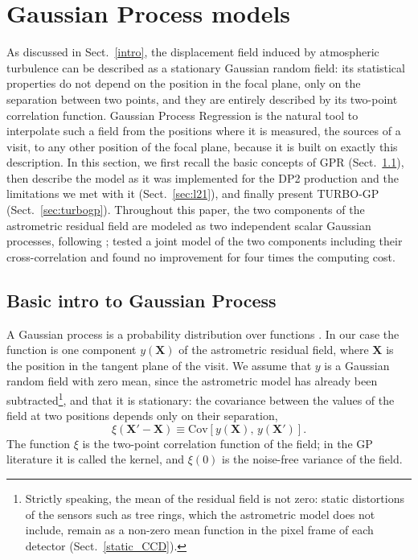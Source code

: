 \section{Gaussian Process models}
\label{GPR}

As discussed in Sect.~\ref{intro}, the displacement field induced by atmospheric turbulence can be described as a stationary Gaussian random field: 
its statistical properties do not depend on the position in the focal plane, only on the separation between two points, and they are entirely 
described by its two-point correlation function.
Gaussian Process Regression is the natural tool to interpolate such a field from the positions where it is measured, the sources of a visit, 
to any other position of the focal plane, because it is built on exactly this description.
In this section, we first recall the basic concepts of GPR (Sect.~\ref{sec:gpbasics}), then describe the  
model as it was implemented for the DP2 production and the limitations we met with it (Sect.~\ref{sec:l21}), and finally present 
TURBO-GP (Sect.~\ref{sec:turbogp}).
Throughout this paper, the two components of the astrometric residual field are modeled as two independent scalar Gaussian 
processes, following ;  tested a joint model of the two components 
including their cross-correlation and found no improvement for four times the computing cost.

\subsection{Basic intro to Gaussian Process}
\label{sec:gpbasics}

A Gaussian process is a probability distribution over functions \citep{rasmussen2006}.
In our case the function is one component $y(\mathbf{X})$ of the astrometric residual field, where $\mathbf{X}$ is the position 
in the tangent plane of the visit.
We assume that $y$ is a Gaussian random field with zero mean, since the astrometric model has already been 
subtracted\footnote{Strictly speaking, the mean of the residual field is not zero: static distortions of the sensors such as tree rings, which the 
astrometric model does not include, remain as a non-zero mean function in the pixel frame of each detector (Sect.~\ref{static_CCD}).}, and that it 
is stationary: the covariance between the values of the field at two positions depends only on their separation,
\begin{equation}
\label{eq:xi}
\xi(\mathbf{X}' - \mathbf{X}) \equiv \mathrm{Cov}\left[y(\mathbf{X}),\, y(\mathbf{X}')\right].
\end{equation}
The function $\xi$ is the two-point correlation function of the field; in the GP literature it is called the kernel, and $\xi(0)$ is the noise-free 
variance of the field.

